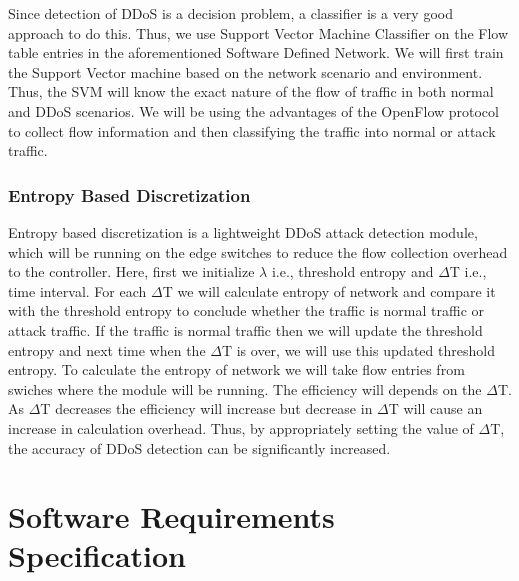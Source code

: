 \documentclass[12pt,a4paper,final]{report}
\begin{document}
Since detection of DDoS is a decision problem, a classifier is a very good approach to do
this. Thus, we use Support Vector Machine Classifier on the Flow table entries in the
aforementioned Software Defined Network. We will first train the Support Vector machine based
on the network scenario and environment. Thus, the SVM will know the exact nature of the flow
of traffic in both normal and DDoS scenarios. We will be using the advantages of the OpenFlow
protocol to collect flow information and then classifying the traffic into normal or attack traffic.

\subsection{Entropy Based Discretization}
Entropy based discretization\cite{BasePaper9} is a lightweight DDoS attack detection module, which will be running on the edge switches to reduce the flow collection overhead to the controller. Here, first we
initialize $\lambda$ i.e., threshold entropy and $\Delta$T i.e., time interval. For each $\Delta$T we will calculate entropy
of network and compare it with the threshold entropy to conclude whether the traffic is normal
traffic or attack traffic. If the traffic is normal traffic then we will update the threshold entropy and
next time when the $\Delta$T is over, we will use this updated threshold entropy. To calculate the entropy
of network we will take flow entries from swiches where the module will be running. The
efficiency will depends on the $\Delta$T. As $\Delta$T decreases the efficiency will increase but decrease in
$\Delta$T will cause an increase in calculation overhead. Thus, by appropriately setting the value of $\Delta$T,
the accuracy of DDoS detection can be significantly increased.
\newpage

\chapter{Software Requirements Specification}
\thispagestyle{empty}
\newpage
\end{document}
